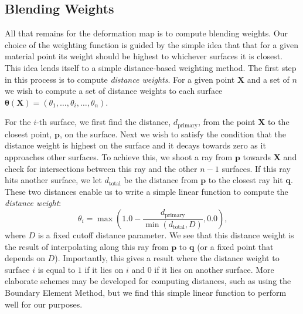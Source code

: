 \subsection{Blending Weights}
All that remains for the deformation map is to compute blending weights. Our choice of the weighting function is guided by the simple idea that that for a given material point its weight should be highest to whichever surfaces it is closest. This idea lends itself to a simple distance-based weighting method. The first step in this process is to compute \textit{distance weights}. For a given point $\mathbf{X}$ and a set of $n$ we wish to compute a set of distance weights to each surface $\mathbf{\theta}(\mathbf{X}) = \left(\theta_1, \dots, \theta_i, \dots, \theta_n \right)$.

For the $i$-th surface, we first find the distance, $d_{\text{primary}}$, from the point $\mathbf{X}$ to the closest point, $\mathbf{p}$, on the surface. Next we wish to satisfy the condition that the distance weight is highest on the surface and it decays towards zero as it approaches other surfaces. To achieve this, we shoot a ray from $\mathbf{p}$ towards $\mathbf{X}$ and check for intersections between this ray and the other $n-1$ surfaces. If this ray hits another surface, we let $d_{\text{total}}$ be the distance from $\mathbf{p}$ to the closest ray hit $\mathbf{q}$. These two distances enable us to write a simple linear function to compute the \textit{distance weight}:
\begin{equation}
\theta_i = \max (1.0 - \frac{d_{\text{primary}}}{\min (d_{\text{total}}, D)}, 0.0)
\text{,}
\end{equation}
where $D$ is a fixed cutoff distance parameter. We see that this distance weight is the result of interpolating along this ray from $\mathbf{p}$ to $\mathbf{q}$ (or a fixed point that depends on $D$). Importantly, this gives a result where the distance weight to surface $i$ is equal to $1$ if it lies on $i$ and $0$ if it lies on another surface. More elaborate schemes may be developed for computing distances, such as using the Boundary Element Method, but we find this simple linear function to perform well for our purposes.

